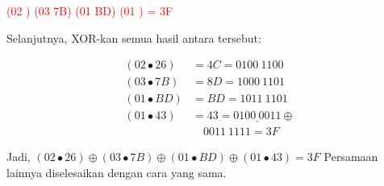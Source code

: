 \documentclass{article}
\begin{document}

\textcolor{red}{(02 ) \oplus (03 \bullet 7B) \oplus (01 \bullet BD) \oplus (01 ) = 3F}

Selanjutnya, XOR-kan semua hasil antara tersebut:

\begin{align*}
(02 \bullet 26) &= 4C = 0100 \ 1100 \\
(03 \bullet 7B) &= 8D = 1000 \ 1101 \\
(01 \bullet BD) &= BD = 1011 \ 1101 \\
(01 \bullet 43) &= 43 = \underline{0100 \ 0011} \oplus \\
& \quad 0011 \ 1111 = 3F
\end{align*}

Jadi, $(02 \bullet 26) \oplus (03 \bullet 7B) \oplus (01 \bullet BD) \oplus (01 \bullet 43) = 3F$
Persamaan lainnya diselesaikan dengan cara yang sama.
\end{document}
